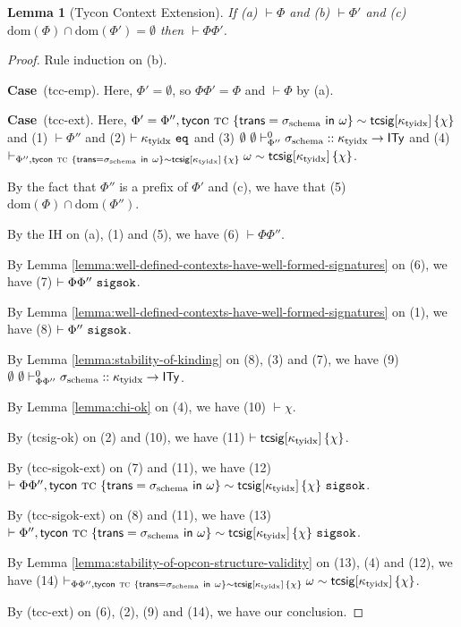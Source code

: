 \documentclass[12pt]{article}
\newtheorem{lemma}{Lemma}
\newcommand{\pfcase}[1]{\textbf{Case}~#1. }
\begin{document}
\begin{lemma}[Tycon Context Extension]
If (a) $\vdash \Phi$ and (b) $\vdash \Phi'$ and (c) $\text{dom}(\Phi) \cap \text{dom}(\Phi') = \emptyset$ then $\vdash \Phi\Phi'$.
\end{lemma}
\begin{proof} Rule induction on (b).

\pfcase{(tcc-emp)} Here, $\Phi'=\emptyset$, so $\Phi\Phi'=\Phi$ and $\vdash \Phi$ by (a).

\pfcase{(tcc-ext)} Here, $\Phi'=\Phi'', {\sf tycon}~\textsc{tc} ~\{{\sf trans}=\sigma_\text{schema}~{\sf in}~\omega\} \sim {\sf tcsig}[\kappa_\text{tyidx}]\,\{\chi\}$ and (1) $\vdash \Phi''$ and (2) $\vdash \kappa_\text{tyidx}~\mathtt{eq}$ and (3) $
    \emptyset~\emptyset \vdash_{\Phi''}^{0} \sigma_\text{schema} :: \kappa_\text{tyidx} \rightarrow {\sf ITy}$ and (4) $
        \vdash_{\Phi'',  {\sf tycon}~\textsc{tc} ~\{{\sf trans}=\sigma_\text{schema}~{\sf in}~\omega\} \sim {\sf tcsig}[\kappa_\text{tyidx}]\,\{\chi\}} \omega \sim {\sf tcsig}[\kappa_\text{tyidx}]\,\{\chi\}$.

        By the fact that $\Phi''$ is a prefix of $\Phi'$ and (c), we have that (5) $\text{dom}(\Phi) \cap \text{dom}(\Phi'')$. 

        By the IH on (a), (1) and (5), we have (6) $\vdash \Phi\Phi''$.

        By Lemma \ref{lemma:well-defined-contexts-have-well-formed-signatures} on (6), we have (7) $\vdash \Phi\Phi''~\mathtt{sigsok}$. 

        By Lemma \ref{lemma:well-defined-contexts-have-well-formed-signatures} on (1), we have (8) $\vdash \Phi''~\mathtt{sigsok}$.

        By Lemma \ref{lemma:stability-of-kinding} on (8), (3) and (7), we have (9) $\emptyset~\emptyset \vdash_{\Phi\Phi''}^{0} \sigma_\text{schema} :: \kappa_\text{tyidx} \rightarrow {\sf ITy}$.

        By Lemma \ref{lemma:chi-ok} on (4), we have (10) $\vdash \chi$.

        By (tcsig-ok) on (2) and (10), we have (11) $\vdash {\sf tcsig}[\kappa_\text{tyidx}]\,\{\chi\}$.

        By (tcc-sigok-ext) on (7) and (11), we have (12) $\vdash \Phi\Phi'', {\sf tycon}~\textsc{tc} ~\{{\sf trans}=\sigma_\text{schema}~{\sf in}~\omega\} \sim {\sf tcsig}[\kappa_\text{tyidx}]\,\{\chi\}~\mathtt{sigsok}$. 

        By (tcc-sigok-ext) on (8) and (11), we have (13) $\vdash \Phi'', {\sf tycon}~\textsc{tc} ~\{{\sf trans}=\sigma_\text{schema}~{\sf in}~\omega\} \sim {\sf tcsig}[\kappa_\text{tyidx}]\,\{\chi\}~\mathtt{sigsok}$.

        By Lemma \ref{lemma:stability-of-opcon-structure-validity} on (13), (4) and (12), we have (14) $
        \vdash_{\Phi\Phi'',  {\sf tycon}~\textsc{tc} ~\{{\sf trans}=\sigma_\text{schema}~{\sf in}~\omega\} \sim {\sf tcsig}[\kappa_\text{tyidx}]\,\{\chi\}} \omega \sim {\sf tcsig}[\kappa_\text{tyidx}]\,\{\chi\}$. 

        By (tcc-ext) on (6), (2), (9) and (14), we have our conclusion. 
\end{proof}
\end{document}
